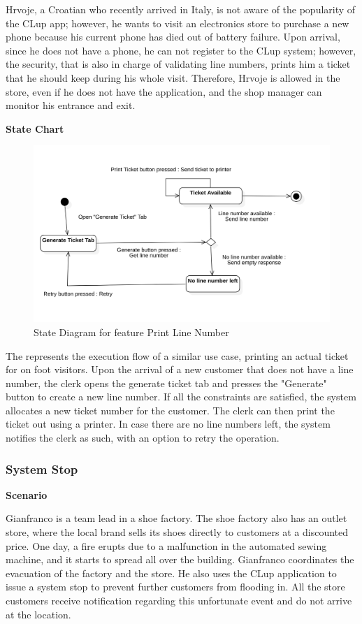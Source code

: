 Hrvoje, a Croatian who recently arrived in Italy, is not aware of the popularity of the CLup app; however, he wants to visit an electronics store to purchase a new phone because his current phone has died out of battery failure.
Upon arrival, since he does not have a phone, he can not register to the CLup system; however, the security, that is also in charge of validating line numbers, prints him a ticket that he should keep during his whole visit.
Therefore, Hrvoje is allowed in the store, even if he does not have the application, and the shop manager can monitor his entrance and exit.

\textbf{State Chart}

\begin{figure}[H]
    \centering
    \includegraphics[height=0.4\textwidth]{Images/StateCharts/PrintTicket.png}
    \caption{State Diagram for feature Print Line Number}
    \label{fig:SDPrintLine}
\end{figure}

The  represents the execution flow of a similar use case, printing an actual ticket for on foot visitors.
Upon the arrival of a new customer that does not have a line number, the clerk opens the generate ticket tab and presses the "Generate" button to create a new line number.
If all the constraints are satisfied, the system allocates a new ticket number for the customer.
The clerk can then print the ticket out using a printer.
In case there are no line numbers left, the system notifies the clerk as such, with an option to retry the operation.

\subsubsection{System Stop}

\textbf{Scenario}

Gianfranco is a team lead in a shoe factory.
The shoe factory also has an outlet store, where the local brand sells its shoes directly to customers at a discounted price.
One day, a fire erupts due to a malfunction in the automated sewing machine, and it starts to spread all over the building.
Gianfranco coordinates the evacuation of the factory and the store.
He also uses the CLup application to issue a system stop to prevent further customers from flooding in.
All the store customers receive notification regarding this unfortunate event and do not arrive at the location.

